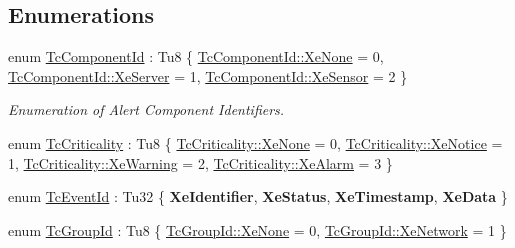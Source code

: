 \subsection*{Enumerations}
\begin{DoxyCompactItemize}
\item 
enum \mbox{\hyperlink{namespace_g_n_common_1_1_n_notification_ab468f440599e6d5a51d887dfa55b06b3}{Tc\+Component\+Id}} \+: Tu8 \{ \mbox{\hyperlink{namespace_g_n_common_1_1_n_notification_ab468f440599e6d5a51d887dfa55b06b3ab1dd4ba140ef44b2b6e425a90b4d11ba}{Tc\+Component\+Id\+::\+Xe\+None}} = 0, 
\mbox{\hyperlink{namespace_g_n_common_1_1_n_notification_ab468f440599e6d5a51d887dfa55b06b3ab55b8d4cd5d9df32ff6504e150b4a53d}{Tc\+Component\+Id\+::\+Xe\+Server}} = 1, 
\mbox{\hyperlink{namespace_g_n_common_1_1_n_notification_ab468f440599e6d5a51d887dfa55b06b3abf624c277a4697a96af203c9507ea0e6}{Tc\+Component\+Id\+::\+Xe\+Sensor}} = 2
 \}
\begin{DoxyCompactList}\small\item\em Enumeration of Alert Component Identifiers. \end{DoxyCompactList}\item 
enum \mbox{\hyperlink{namespace_g_n_common_1_1_n_notification_a7d5c0650483fe26fa420ae5bf787566b}{Tc\+Criticality}} \+: Tu8 \{ \mbox{\hyperlink{namespace_g_n_common_1_1_n_notification_a7d5c0650483fe26fa420ae5bf787566bab1dd4ba140ef44b2b6e425a90b4d11ba}{Tc\+Criticality\+::\+Xe\+None}} = 0, 
\mbox{\hyperlink{namespace_g_n_common_1_1_n_notification_a7d5c0650483fe26fa420ae5bf787566ba39f782b17c3f84e4d5a1520a6192a4bc}{Tc\+Criticality\+::\+Xe\+Notice}} = 1, 
\mbox{\hyperlink{namespace_g_n_common_1_1_n_notification_a7d5c0650483fe26fa420ae5bf787566ba65e6096570843ed0b2a2aadab454461c}{Tc\+Criticality\+::\+Xe\+Warning}} = 2, 
\mbox{\hyperlink{namespace_g_n_common_1_1_n_notification_a7d5c0650483fe26fa420ae5bf787566ba0e85256e385dd26a18c910f1f4d1c993}{Tc\+Criticality\+::\+Xe\+Alarm}} = 3
 \}
\item 
enum \mbox{\hyperlink{namespace_g_n_common_1_1_n_notification_a8d5ce0e5fbb0a6cdcd96e4b037656761}{Tc\+Event\+Id}} \+: Tu32 \{ {\bfseries Xe\+Identifier}, 
{\bfseries Xe\+Status}, 
{\bfseries Xe\+Timestamp}, 
{\bfseries Xe\+Data}
 \}
\item 
enum \mbox{\hyperlink{namespace_g_n_common_1_1_n_notification_af29017ad6ed59156beabc385a91db18e}{Tc\+Group\+Id}} \+: Tu8 \{ \mbox{\hyperlink{namespace_g_n_common_1_1_n_notification_af29017ad6ed59156beabc385a91db18eab1dd4ba140ef44b2b6e425a90b4d11ba}{Tc\+Group\+Id\+::\+Xe\+None}} = 0, 
\mbox{\hyperlink{namespace_g_n_common_1_1_n_notification_af29017ad6ed59156beabc385a91db18eaf127afdc99e6a03185eab77f17740359}{Tc\+Group\+Id\+::\+Xe\+Network}} = 1
 \}
\end{DoxyCompactItemize}


